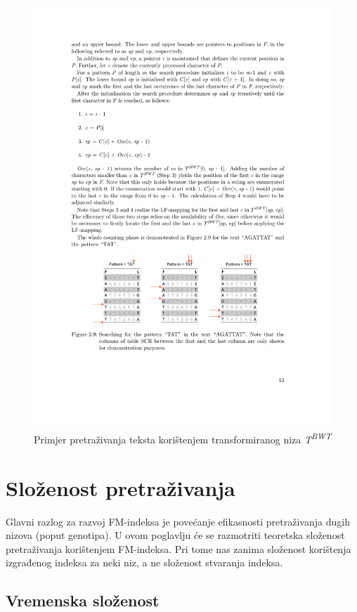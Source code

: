 \documentclass[times, utf8, seminar, numeric]{fer}
\begin{document}
\begin{figure}[!htb]
\centering
\includegraphics{fig/sa_search.pdf}
\caption{Primjer pretraživanja teksta korištenjem transformiranog niza \textit{T\textsuperscript{BWT}}}
\label{fig:sa_search}
\end{figure}

\section{Složenost pretraživanja}

Glavni razlog za razvoj FM-indeksa je povećanje efikasnosti pretraživanja dugih nizova
(poput genotipa). U ovom poglavlju će se razmotriti teoretska složenost pretraživanja korištenjem
FM-indeksa. Pri tome nas zanima složenost korištenja
izgrađenog indeksa za neki niz, a ne složenost stvaranja indeksa.

\subsection{Vremenska složenost}
\end{document}
